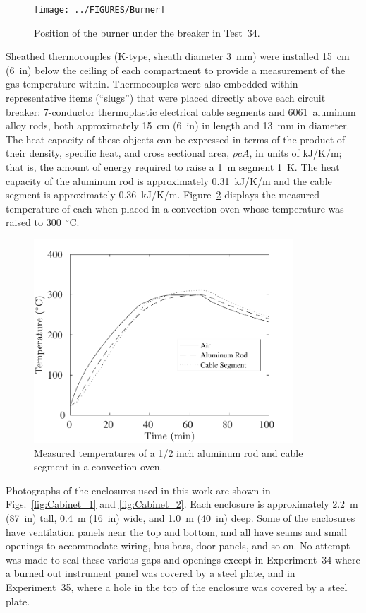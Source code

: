 \begin{figure}[ht]
\centering
\texttt{[image: ../FIGURES/Burner]}
\caption[Position of the burner] {Position of the burner under the breaker in Test~34.}
\label{fig:Burner}
\end{figure}

Sheathed thermocouples (K-type, sheath diameter 3~mm) were installed 15~cm (6~in) below the ceiling of each compartment to provide a measurement of the gas temperature within. Thermocouples were also embedded within representative items (``slugs'') that were placed directly above each circuit breaker: 7-conductor thermoplastic electrical cable segments and 6061~aluminum alloy rods, both approximately  15~cm (6~in) in length and 13~mm in diameter. The heat capacity of these objects can be expressed in terms of the product of their density, specific heat, and cross sectional area, $\rho c A$, in units of kJ/K/m; that is, the amount of energy required to raise a 1~m segment 1~K. The heat capacity of the aluminum rod is approximately 0.31~kJ/K/m and the cable segment is approximately 0.36~kJ/K/m. Figure~\ref{oven} displays the measured temperature of each when placed in a convection oven whose temperature was raised to 300~$^\circ$C.

\begin{figure}[!ht]
\centering
\includegraphics[height=3.0in]{../SCRIPT_FIGURES/Oven_Test}
\caption[Measured temperatures of slug calorimeters in a convection oven]{Measured temperatures of a 1/2 inch aluminum rod and cable segment in a convection oven.}
\label{oven}
\end{figure}

Photographs of the enclosures used in this work are shown in Figs.~\ref{fig:Cabinet_1} and \ref{fig:Cabinet_2}. Each enclosure is approximately 2.2~m (87~in) tall, 0.4~m (16~in) wide, and 1.0~m (40~in) deep. Some of the enclosures have ventilation panels near the top and bottom, and all have seams and small openings to accommodate wiring, bus bars, door panels, and so on. No attempt was made to seal these various gaps and openings except in Experiment~34 where a burned out instrument panel was covered by a steel plate, and in Experiment~35, where a hole in the top of the enclosure was covered by a steel plate.



